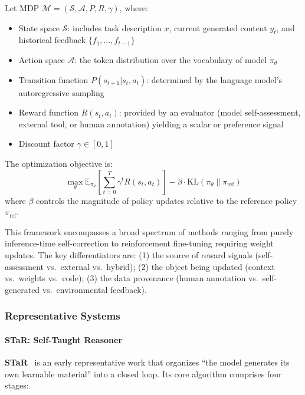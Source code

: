 \begin{definition}\label{def:reward-mdp}
Let MDP $\mathcal{M} = (\mathcal{S}, \mathcal{A}, P, R, \gamma)$, where:
\begin{itemize}
\item State space $\mathcal{S}$: includes task description $x$, current generated content $y_t$, and historical feedback $\{f_1, \ldots, f_{t-1}\}$
\item Action space $\mathcal{A}$: the token distribution over the vocabulary of model $\pi_\theta$
\item Transition function $P(s_{t+1} | s_t, a_t)$: determined by the language model's autoregressive sampling
\item Reward function $R(s_t, a_t)$: provided by an evaluator (model self-assessment, external tool, or human annotation) yielding a scalar or preference signal
\item Discount factor $\gamma \in [0, 1]$
\end{itemize}
The optimization objective is:
\begin{equation}
\max_\theta \mathbb{E}_{\pi_\theta}\left[\sum_{t=0}^{T} \gamma^t R(s_t, a_t)\right] - \beta \cdot \mathrm{KL}(\pi_\theta \| \pi_{\mathrm{ref}})
\label{eq:reward-mdp}
\end{equation}
where $\beta$ controls the magnitude of policy updates relative to the reference policy $\pi_{\mathrm{ref}}$.
\end{definition}

This framework encompasses a broad spectrum of methods ranging from purely inference-time self-correction to reinforcement fine-tuning requiring weight updates. The key differentiators are: (1) the source of reward signals (self-assessment vs.\ external vs.\ hybrid); (2) the object being updated (context vs.\ weights vs.\ code); (3) the data provenance (human annotation vs.\ self-generated vs.\ environmental feedback).

\subsubsection{Representative Systems}

\paragraph{STaR: Self-Taught Reasoner}

\textbf{STaR}~\citep{star2022} is an early representative work that organizes ``the model generates its own learnable material'' into a closed loop. Its core algorithm comprises four stages:

